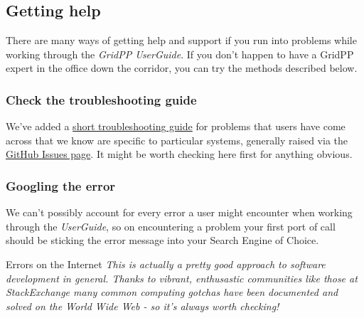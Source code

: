\subsection{Getting help}
\label{sec:help}
There are many ways of getting help and support if you run into problems
while working through the \emph{GridPP UserGuide}. If you don't happen
to have a GridPP expert in the office down the corridor, you can try the
methods described below.

\subsubsection{Check the troubleshooting guide}
\label{check-the-troubleshooting-guide}

We've added a
\hyperref[sec:troubleshooting]{short troubleshooting guide}
for problems that users have come across that we
know are specific to particular systems, generally raised via the
\href{http://github.com/gridpp/user-guides/issues}{GitHub Issues page}.
It might be worth checking here first for anything obvious.

\subsubsection{Googling the error}
\label{googling-the-error}
We can't possibly account for every error a user might encounter when
working through the \emph{UserGuide}, so on encountering a problem your
first port of call should be sticking the error message into your Search
Engine of Choice.

\begin{infobox}{Errors on the Internet}
\emph{This is actually a pretty good approach to software development in
general. Thanks to vibrant, enthusastic communities like those at
StackExchange many common computing gotchas have been documented and
solved on the World Wide Web - so it's always worth checking!}
\end{infobox}

